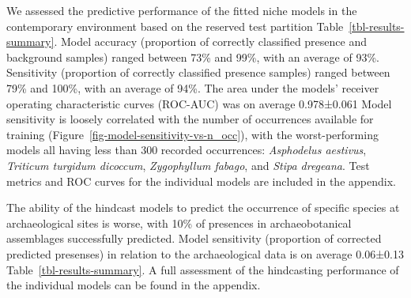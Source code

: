 \documentclass[
  authoryear,
  preprint]{elsarticle}
\begin{document}
We assessed the predictive performance of the fitted niche models in the
contemporary environment based on the reserved test partition
Table~\ref{tbl-results-summary}. Model accuracy (proportion of correctly
classified presence and background samples) ranged between 73\% and
99\%, with an average of 93\%. Sensitivity (proportion of correctly
classified presence samples) ranged between 79\% and 100\%, with an
average of 94\%. The area under the models' receiver operating
characteristic curves (ROC-AUC) was on average 0.978±0.061 Model
sensitivity is loosely correlated with the number of occurrences
available for training (Figure~\ref{fig-model-sensitivity-vs-n_occ}),
with the worst-performing models all having less than 300 recorded
occurrences: \emph{Asphodelus aestivus}, \emph{Triticum turgidum
dicoccum}, \emph{Zygophyllum fabago}, and \emph{Stipa dregeana}. Test
metrics and ROC curves for the individual models are included in the
appendix.

The ability of the hindcast models to predict the occurrence of specific
species at archaeological sites is worse, with 10\% of presences in
archaeobotanical assemblages successfully predicted. Model sensitivity
(proportion of corrected predicted presenses) in relation to the
archaeological data is on average 0.06±0.13
Table~\ref{tbl-results-summary}. A full assessment of the hindcasting
performance of the individual models can be found in the appendix.

\begingroup
\setlength{}
\setlength{}\fontsize{8.2pt}{9.9pt}\selectfont
\setlength{\LTpost}{0mm}
\end{document}
